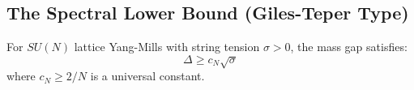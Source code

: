 
\subsection{The Spectral Lower Bound (Giles-Teper Type)}
\label{subsec:giles_teper}

\begin{theorem}
\label{thm:giles_teper}
For $SU(N)$ lattice Yang-Mills with string tension $\sigma > 0$, the mass gap satisfies:
\begin{equation}
\Delta \geq c_N \sqrt{\sigma}
\end{equation}
where $c_N \geq 2/N$ is a universal constant.
\end{theorem}

